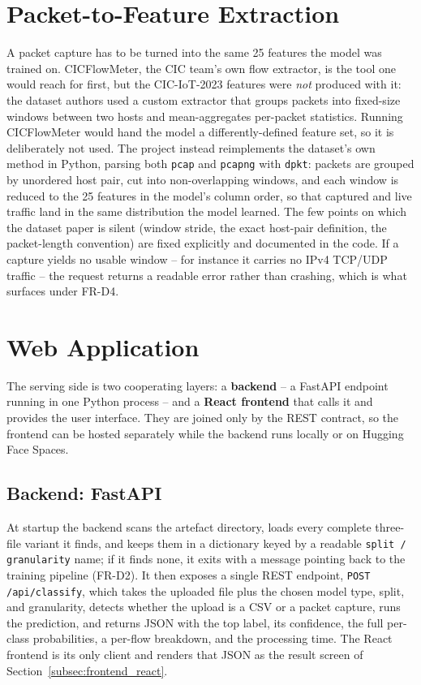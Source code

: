 \section{Packet-to-Feature Extraction}
\label{sec:cicflowmeter_design}

\par A packet capture has to be turned into the same 25 features the model was trained on. CICFlowMeter, the CIC team's own flow extractor, is the tool one would reach for first, but the CIC-IoT-2023 features were \emph{not} produced with it: the dataset authors used a custom extractor that groups packets into fixed-size windows between two hosts and mean-aggregates per-packet statistics. Running CICFlowMeter would hand the model a differently-defined feature set, so it is deliberately not used. The project instead reimplements the dataset's own method in Python, parsing both \texttt{pcap} and \texttt{pcapng} with \texttt{dpkt}: packets are grouped by unordered host pair, cut into non-overlapping windows, and each window is reduced to the 25 features in the model's column order, so that captured and live traffic land in the same distribution the model learned. The few points on which the dataset paper is silent (window stride, the exact host-pair definition, the packet-length convention) are fixed explicitly and documented in the code. If a capture yields no usable window -- for instance it carries no IPv4 TCP/UDP traffic -- the request returns a readable error rather than crashing, which is what surfaces under FR-D4.

\section{Web Application}
\label{sec:webapp_design}

\par The serving side is two cooperating layers: a \textbf{backend} -- a FastAPI endpoint running in one Python process -- and a \textbf{React frontend} that calls it and provides the user interface. They are joined only by the REST contract, so the frontend can be hosted separately while the backend runs locally or on Hugging Face Spaces.

\subsection{Backend: FastAPI}
\label{subsec:backend_gradio_fastapi}

\par At startup the backend scans the artefact directory, loads every complete three-file variant it finds, and keeps them in a dictionary keyed by a readable \texttt{split / granularity} name; if it finds none, it exits with a message pointing back to the training pipeline (FR-D2). It then exposes a single REST endpoint, \texttt{POST /api/classify}, which takes the uploaded file plus the chosen model type, split, and granularity, detects whether the upload is a CSV or a packet capture, runs the prediction, and returns JSON with the top label, its confidence, the full per-class probabilities, a per-flow breakdown, and the processing time. The React frontend is its only client and renders that JSON as the result screen of Section~\ref{subsec:frontend_react}.

